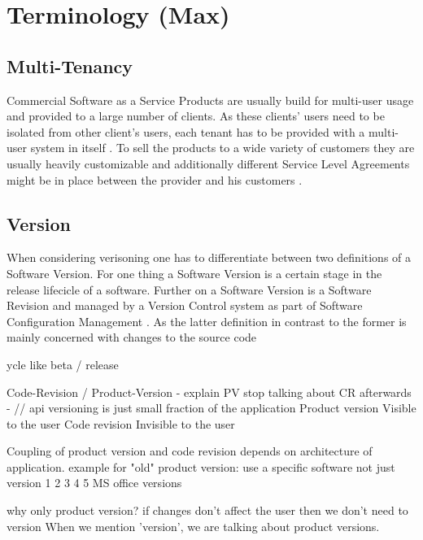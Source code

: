 \section{Terminology (Max)}
\label{sec:terminology}

\subsection{Multi-Tenancy}

Commercial Software as a Service Products are usually build for multi-user usage and provided to a large number of clients. As these clients' users need to be isolated from other client's users, each tenant has to be provided with a multi-user system in itself \cite{Chong2006a}. To sell the products to a wide variety of customers they are usually heavily customizable and additionally different Service Level Agreements might be in place between the provider and his customers \cite{Bezemer2010}.

\subsection{Version}

When considering verisoning one has to differentiate between two definitions of a Software Version.
For one thing a Software Version is a certain stage in the release lifecicle of a software.
Further on a Software Version is a Software Revision and managed by a Version Control system as part of Software Configuration Management \cite{swebook}.
As the latter definition in contrast to the former is mainly concerned with changes to the source code

ycle like beta / release


Code-Revision / Product-Version
  - explain PV stop talking about CR afterwards
  - // api versioning is just small fraction of the application
  Product version Visible to the user
  Code revision   Invisible to the user

  Coupling of product version and code revision depends on architecture of application.
  example for "old" product version: use a specific software not just version 1 2 3 4 5
  MS office versions

  why only product version?
  if changes don't affect the user then we don't need to version
  When we mention 'version', we are talking about product versions.


